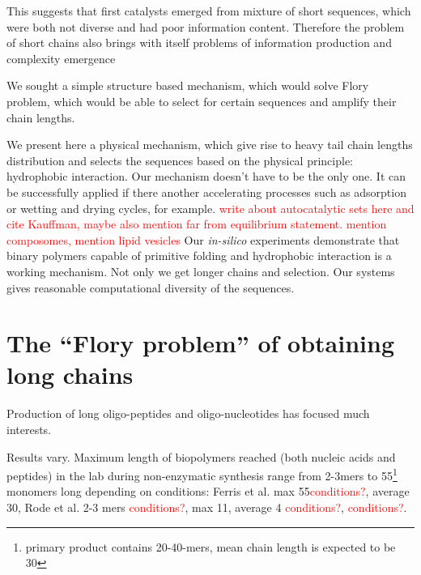 \documentclass[journal=jacsat,manuscript=article,layout=twocolumn]{achemso}
\newcommand*{\red}[1]{\textcolor{red}{#1}}
\begin{document}
This suggests that first catalysts emerged from mixture of short sequences, which were both 
not diverse and had poor information content. Therefore the problem of short chains also brings 
with itself problems of information production and complexity emergence \cite{Joyce1987,Abel2005}

 We sought a simple structure based mechanism, 
which would solve Flory problem, which would be able to select for certain sequences and 
amplify their chain lengths.

 We present here a physical mechanism, which give rise to 
heavy tail chain lengths distribution and selects the sequences based on the physical principle: 
hydrophobic interaction. Our mechanism doesn't have to be the only one. It can be successfully 
applied if there another accelerating processes such as adsorption or wetting and drying cycles, 
for example.
\red{write about autocatalytic sets here and cite Kauffman, maybe also mention far from 
equilibrium statement. mention composomes, mention lipid vesicles \cite{Luisi1999,Deamer2008}}
Our \textit{in-silico} experiments demonstrate that binary polymers 
capable of primitive folding and hydrophobic interaction is a working mechanism. Not only we get 
longer chains and selection. Our systems gives reasonable computational diversity of the sequences.


   
\section{The ``Flory problem'' of obtaining long chains}
\label{sec:flory} Production of long oligo-peptides and oligo-nucleotides 
has focused much interests\cite{Shapiro1984,Ferris1996,Kanavarioti2001,Brack2007,Danger2012}.

Results vary. Maximum length of biopolymers reached (both nucleic acids and peptides) in the lab 
during non-enzymatic synthesis range from 2-3mers to 
55\footnote{primary product contains 20-40-mers, mean chain length is expected to be 
30\cite{Ferris1996}} monomers long depending on conditions: 
Ferris et al. max 55\red{conditions?}, average 30\cite{Ferris1996}, Rode et al. 2-3 mers
\cite{Rode1999}\red{conditions?}, max 11, average 4 \cite{Kanavarioti2001}\red{conditions?}, 
\cite{Leman2004a}\red{conditions?}. 
\end{document}
